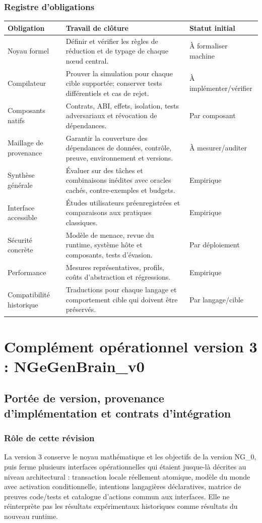 \documentclass[11pt,a4paper,openany]{book}
\theoremstyle{definition}
\theoremstyle{plain}
\theoremstyle{remark}
\begin{document}
\section{Registre d'obligations}
\begin{longtable}{p{}p{}p{}}
\toprule
\textbf{Obligation} & \textbf{Travail de clôture} & \textbf{Statut initial}\\
\midrule
Noyau formel & Définir et vérifier les règles de réduction et de typage de chaque nœud central. & À formaliser machine\\
Compilateur & Prouver la simulation pour chaque cible supportée; conserver tests différentiels et cas de rejet. & À implémenter/vérifier\\
Composants natifs & Contrats, ABI, effets, isolation, tests adversariaux et révocation de dépendances. & Par composant\\
Maillage de provenance & Garantir la couverture des dépendances de données, contrôle, preuve, environnement et versions. & À mesurer/auditer\\
Synthèse générale & Évaluer sur des tâches et combinaisons inédites avec oracles cachés, contre-exemples et budgets. & Empirique\\
Interface accessible & Études utilisateurs préenregistrées et comparaisons aux pratiques classiques. & Empirique\\
Sécurité concrète & Modèle de menace, revue du runtime, système hôte et composants, tests d'évasion. & Par déploiement\\
Performance & Mesures représentatives, profils, coûts d'abstraction et régressions. & Empirique\\
Compatibilité historique & Traductions pour chaque langage et comportement cible qui doivent être préservés. & Par langage/cible\\
\bottomrule
\end{longtable}


\part{Complément opérationnel version 3 : NGeGenBrain\_v0}

\chapter{Portée de version, provenance d'implémentation et contrats d'intégration}
\section{Rôle de cette révision}
La version 3 conserve le noyau mathématique et les objectifs de la version NG\_0, puis ferme plusieurs interfaces opérationnelles qui étaient jusque-là décrites au niveau architectural : transaction locale réellement atomique, modèle du monde avec activation conditionnelle, intentions langagières déclaratives, matrice de preuves code/tests et catalogue d'actions commun aux interfaces. Elle ne réinterprète pas les résultats expérimentaux historiques comme résultats du nouveau runtime.
\end{document}
